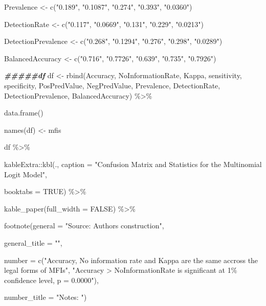\documentclass[a4paper,nobind]{templates/ociamthesis}
\newenvironment{Shaded}{\begin{snugshade}}{\end{snugshade}}
\newcommand{\AttributeTok}[1]{\textcolor[rgb]{0.77,0.63,0.00}{#1}}
\newcommand{\ConstantTok}[1]{\textcolor[rgb]{0.00,0.00,0.00}{#1}}
\newcommand{\DocumentationTok}[1]{\textcolor[rgb]{0.56,0.35,0.01}{\textbf{\textit{#1}}}}
\newcommand{\FunctionTok}[1]{\textcolor[rgb]{0.00,0.00,0.00}{#1}}
\newcommand{\NormalTok}[1]{#1}
\newcommand{\OtherTok}[1]{\textcolor[rgb]{0.56,0.35,0.01}{#1}}
\newcommand{\SpecialCharTok}[1]{\textcolor[rgb]{0.00,0.00,0.00}{#1}}
\newcommand{\StringTok}[1]{\textcolor[rgb]{0.31,0.60,0.02}{#1}}
\renewenvironment{Shaded}
{
  \vspace{10pt}%
  \begin{snugshade}%
}{%
  \end{snugshade}%
  \vspace{8pt}%
}
\begin{document}
\begin{Shaded}
\begin{Highlighting}[]
\NormalTok{Prevalence }\OtherTok{\textless{}{-}} \FunctionTok{c}\NormalTok{(}\StringTok{"0.189"}\NormalTok{, }\StringTok{"0.1087"}\NormalTok{, }\StringTok{"0.274"}\NormalTok{, }\StringTok{"0.393"}\NormalTok{, }\StringTok{"0.0360"}\NormalTok{)}

\NormalTok{DetectionRate }\OtherTok{\textless{}{-}} \FunctionTok{c}\NormalTok{(}\StringTok{"0.117"}\NormalTok{, }\StringTok{"0.0669"}\NormalTok{, }\StringTok{"0.131"}\NormalTok{, }\StringTok{"0.229"}\NormalTok{, }\StringTok{"0.0213"}\NormalTok{)}

\NormalTok{DetectionPrevalence }\OtherTok{\textless{}{-}} \FunctionTok{c}\NormalTok{(}\StringTok{"0.268"}\NormalTok{, }\StringTok{"0.1294"}\NormalTok{, }\StringTok{"0.276"}\NormalTok{, }\StringTok{"0.298"}\NormalTok{, }\StringTok{"0.0289"}\NormalTok{)}

\NormalTok{BalancedAccuracy }\OtherTok{\textless{}{-}} \FunctionTok{c}\NormalTok{(}\StringTok{"0.716"}\NormalTok{, }\StringTok{"0.7726"}\NormalTok{, }\StringTok{"0.639"}\NormalTok{, }\StringTok{"0.735"}\NormalTok{, }\StringTok{"0.7926"}\NormalTok{)}
 
\DocumentationTok{\#\#\#\#\#df}
\NormalTok{df }\OtherTok{\textless{}{-}} \FunctionTok{rbind}\NormalTok{(Accuracy, NoInformationRate, Kappa, sensitivity, specificity, PosPredValue, NegPredValue, Prevalence, DetectionRate, DetectionPrevalence, BalancedAccuracy) }\SpecialCharTok{\%\textgreater{}\%} 
  
  \FunctionTok{data.frame}\NormalTok{()}

\FunctionTok{names}\NormalTok{(df) }\OtherTok{\textless{}{-}}\NormalTok{ mfis}

\NormalTok{df }\SpecialCharTok{\%\textgreater{}\%} 
  
\NormalTok{  kableExtra}\SpecialCharTok{::}\FunctionTok{kbl}\NormalTok{(., }\AttributeTok{caption =} \StringTok{"Confusion Matrix and Statistics for the Multinomial Logit Model"}\NormalTok{, }
      
  \AttributeTok{booktabs =} \ConstantTok{TRUE}\NormalTok{) }\SpecialCharTok{\%\textgreater{}\%} 
  
  \FunctionTok{kable\_paper}\NormalTok{(}\AttributeTok{full\_width =} \ConstantTok{FALSE}\NormalTok{) }\SpecialCharTok{\%\textgreater{}\%} 
  
  \FunctionTok{footnote}\NormalTok{(}\AttributeTok{general =} \StringTok{"Source: Authors\textquotesingle{} construction"}\NormalTok{,}
           
  \AttributeTok{general\_title =} \StringTok{""}\NormalTok{,}
  
  \AttributeTok{number =} \FunctionTok{c}\NormalTok{(}\StringTok{"Accuracy, No information rate and Kappa are the same accross the legal forms of MFIs"}\NormalTok{, }\StringTok{"Accuracy \textgreater{} NoInformationRate is significant at 1\% confidence level, p = 0.0000"}\NormalTok{),}
  
  \AttributeTok{number\_title =} \StringTok{"Notes: "}\NormalTok{)}
\end{Highlighting}
\end{Shaded}
\end{document}
